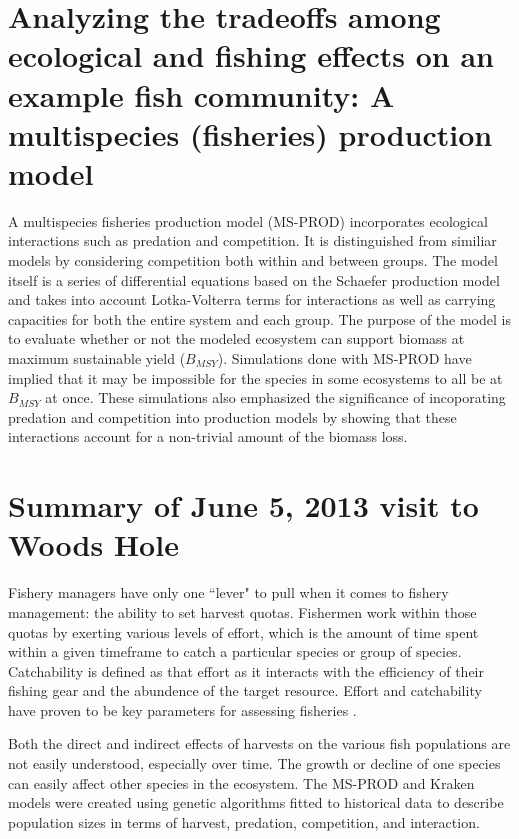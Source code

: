 \documentclass{article}
\begin{document}
\section{Analyzing the tradeoffs among ecological and fishing effects on an example fish community: A multispecies (fisheries) production model}

A multispecies fisheries production model (MS-PROD) \cite{Gamble20092570} incorporates ecological interactions such as predation and competition.  It is distinguished from similiar models by considering competition both within and between groups.  The model itself is a series of differential equations based on the Schaefer production model and takes into account Lotka-Volterra terms for interactions as well as carrying capacities for both the entire system and each group.  The purpose of the model is to evaluate whether or not the modeled ecosystem can support biomass at maximum sustainable yield ($B_{MSY}$).  Simulations done with MS-PROD have implied that it may be impossible for the species in some ecosystems to all be at $B_{MSY}$ at once.  These simulations also emphasized the significance of incoporating predation and competition into production models by showing that these interactions account for a non-trivial amount of the biomass loss.

\section{Summary of June 5, 2013 visit to Woods Hole}

Fishery managers have only one ``lever" to pull when it comes to fishery management: the ability to set harvest quotas.  Fishermen work within those quotas by exerting various levels of effort, which is the amount of time spent within a given timeframe to catch a particular species or group of species.  Catchability is defined as that effort as it interacts with the efficiency of their fishing gear and the abundence of the target resource.  Effort and catchability have proven to be key parameters for assessing fisheries \cite{ArreguinSanchez1996}. 

Both the direct and indirect effects of harvests on the various fish populations are not easily understood, especially over time.  The growth or decline of one species can easily affect other species in the ecosystem.  The MS-PROD and Kraken models were created using genetic algorithms fitted to historical data to describe population sizes in terms of harvest, predation, competition, and interaction.
\end{document}

